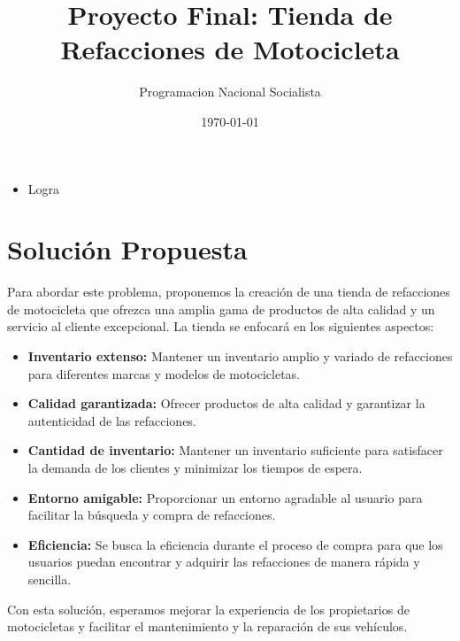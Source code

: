\documentclass{report}
\title{Proyecto Final: Tienda de Refacciones de Motocicleta}
\author{Programacion Nacional Socialista}
\date{\today}
\begin{document}
\maketitle




\begin{itemize}
    \item Logra 
\end{itemize}

\section{Solución Propuesta}

Para abordar este problema, proponemos la creación de una tienda de refacciones de motocicleta que ofrezca una amplia gama de productos de alta calidad y un servicio al cliente excepcional. 
La tienda se enfocará en los siguientes aspectos:

\begin{itemize}
    \item \textbf{Inventario extenso:} Mantener un inventario amplio y variado de refacciones para diferentes marcas y modelos de motocicletas.
    \item \textbf{Calidad garantizada:} Ofrecer productos de alta calidad y garantizar la autenticidad de las refacciones.
    \item \textbf{Cantidad de inventario:} Mantener un inventario suficiente para satisfacer la demanda de los clientes y minimizar los tiempos de espera.  
    \item \textbf{Entorno amigable:} Proporcionar un entorno agradable al usuario para facilitar la búsqueda y compra de refacciones. 
    \item \textbf{Eficiencia:} Se busca la eficiencia durante el proceso de compra para que los usuarios puedan encontrar y adquirir las refacciones de manera rápida y sencilla.
\end{itemize}

Con esta solución, esperamos mejorar la experiencia de los propietarios de motocicletas y facilitar el mantenimiento y la reparación de sus vehículos.
\end{document}
